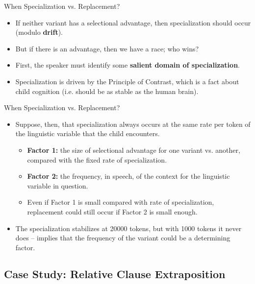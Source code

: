 \documentclass[hyperref={pdfpagelabels=false}]{beamer}
\begin{document}
\begin{frame}{When Specialization vs. Replacement?}
\begin{itemize}
	\item If neither variant has a selectional advantage, then specialization should occur (modulo \textbf{drift}).
	\item But if there is an advantage, then we have a race; who wins?
	\item First, the speaker must identify some \textbf{salient domain of specialization}.
	\item Specialization is driven by the Principle of Contrast, which is a fact about child cognition (i.e. should be as stable as the human brain).
\end{itemize}
\end{frame}

\begin{frame}{When Specialization vs. Replacement?}
\begin{itemize}
	\item Suppose, then, that specialization always occurs at the same rate per token of the linguistic variable that the child encounters.
	\begin{itemize}
		\item \textbf{Factor 1:} the size of selectional advantage for one variant vs. another, compared with the fixed rate of specialization.
		\item \textbf{Factor 2:} the frequency, in speech, of the context for the linguistic variable in question.
		\item Even if Factor 1 is small compared with rate of specialization, replacement could still occur if Factor 2 is small enough.
	\end{itemize}
	\item The specialization stabilizes at 20000 tokens, but with 1000 tokens it never does -- implies that the frequency of the variant could be a determining factor.
\end{itemize}
\end{frame}




\subsection{Case Study: Relative Clause Extraposition}
\end{document}
